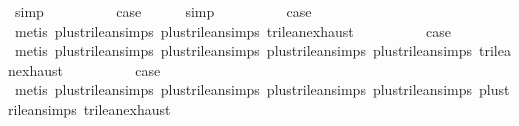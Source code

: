 \begin{isabellebody}
\ simp\isanewline
{}\isamarkupfalse%
\isanewline
\ \ \isamarkupfalse%
\ {\isachardoublequoteopen}{}{\isacharunderscore}{}{\isachardoublequoteclose}\isanewline
\ \ \isamarkupfalse%
\ \isamarkupfalse%
\ {\isacharquery}case\isanewline
\ \ \ \ \isamarkupfalse%
\ simp\isanewline
{}\isamarkupfalse%
\isanewline
\ \ \isamarkupfalse%
\ {\isachardoublequoteopen}{}{\isacharunderscore}{}{\isachardoublequoteclose}\isanewline
\ \ \isamarkupfalse%
\ \isamarkupfalse%
\ {\isacharquery}case\isanewline
\ \ \ \ \isamarkupfalse%
\ {\isacharparenleft}metis\ plus{\isacharunderscore}trilean{\isachardot}simps{\isacharparenleft}{}{\isacharparenright}\ plus{\isacharunderscore}trilean{\isachardot}simps{\isacharparenleft}{}{\isacharparenright}\ trilean{\isachardot}exhaust{\isacharparenright}\isanewline
{}\isamarkupfalse%
\isanewline
\ \ \isamarkupfalse%
\ {\isachardoublequoteopen}{}{\isacharunderscore}{}{\isachardoublequoteclose}\isanewline
\ \ \isamarkupfalse%
\ \isamarkupfalse%
\ {\isacharquery}case\isanewline
\ \ \ \ \isamarkupfalse%
\ {\isacharparenleft}metis\ plus{\isacharunderscore}trilean{\isachardot}simps{\isacharparenleft}{}{\isacharparenright}\ plus{\isacharunderscore}trilean{\isachardot}simps{\isacharparenleft}{}{\isacharparenright}\ plus{\isacharunderscore}trilean{\isachardot}simps{\isacharparenleft}{}{\isacharparenright}\ plus{\isacharunderscore}trilean{\isachardot}simps{\isacharparenleft}{}{\isacharparenright}\ trilean{\isachardot}exhaust{\isacharparenright}\isanewline
{}\isamarkupfalse%
\isanewline
\ \ \isamarkupfalse%
\ {}\isanewline
\ \ \isamarkupfalse%
\ \isamarkupfalse%
\ {\isacharquery}case\isanewline
\ \ \ \ \isamarkupfalse%
\ {\isacharparenleft}metis\ plus{\isacharunderscore}trilean{\isachardot}simps{\isacharparenleft}{}{\isacharparenright}\ plus{\isacharunderscore}trilean{\isachardot}simps{\isacharparenleft}{}{\isacharparenright}\ plus{\isacharunderscore}trilean{\isachardot}simps{\isacharparenleft}{}{\isacharparenright}\ plus{\isacharunderscore}trilean{\isachardot}simps{\isacharparenleft}{}{\isacharparenright}\ plus{\isacharunderscore}trilean{\isachardot}simps{\isacharparenleft}{}{\isacharparenright}\ trilean{\isachardot}exhaust{\isacharparenright}\isanewline

\end{isabellebody}
